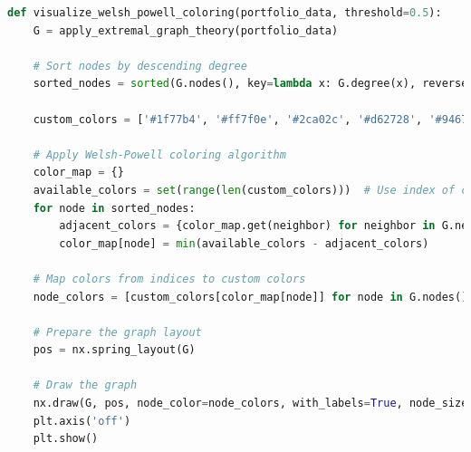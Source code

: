 \documentclass{article}
\begin{document}
\begin{appendices}
\begin{lstlisting}[language=python]
def visualize_welsh_powell_coloring(portfolio_data, threshold=0.5):
    G = apply_extremal_graph_theory(portfolio_data)

    # Sort nodes by descending degree
    sorted_nodes = sorted(G.nodes(), key=lambda x: G.degree(x), reverse=True)

    custom_colors = ['#1f77b4', '#ff7f0e', '#2ca02c', '#d62728', '#9467bd', '#8c564b']

    # Apply Welsh-Powell coloring algorithm
    color_map = {}
    available_colors = set(range(len(custom_colors)))  # Use index of custom colors
    for node in sorted_nodes:
        adjacent_colors = {color_map.get(neighbor) for neighbor in G.neighbors(node)}
        color_map[node] = min(available_colors - adjacent_colors)

    # Map colors from indices to custom colors
    node_colors = [custom_colors[color_map[node]] for node in G.nodes()]

    # Prepare the graph layout
    pos = nx.spring_layout(G)

    # Draw the graph
    nx.draw(G, pos, node_color=node_colors, with_labels=True, node_size=700, edge_color='gray', linewidths=0.5, font_size=12)
    plt.axis('off')
    plt.show()
\end{lstlisting}

\end{appendices}
\end{document}
